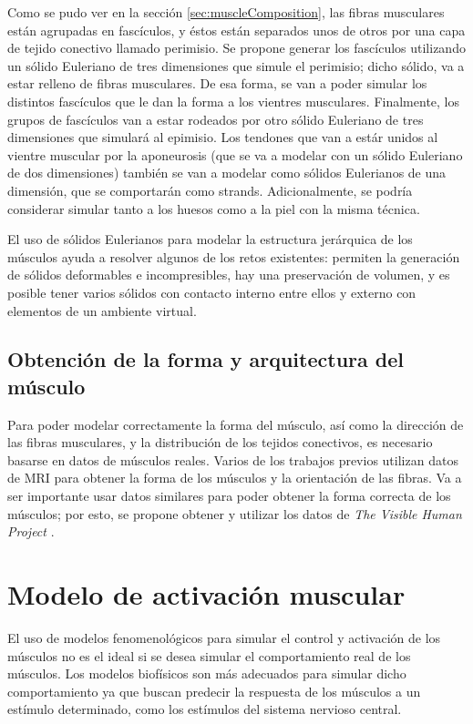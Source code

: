 Como se pudo ver en la sección \ref{sec:muscleComposition}, las fibras musculares están agrupadas en fascículos, y  éstos están separados unos de otros por una capa de tejido conectivo llamado perimisio. Se propone generar los fascículos utilizando un sólido Euleriano de tres dimensiones que simule el perimisio; dicho sólido, va a estar relleno de fibras musculares. De esa forma, se van a poder simular los distintos fascículos que le dan la forma a los vientres musculares. Finalmente, los grupos de fascículos van a estar rodeados por otro sólido Euleriano de tres dimensiones que simulará al epimisio. Los tendones que van a estár unidos al vientre muscular por la aponeurosis (que se va a modelar con un sólido Euleriano de dos dimensiones) también se van a modelar como sólidos Eulerianos de una dimensión, que se comportarán como strands. Adicionalmente, se podría considerar simular tanto a los huesos como a la piel con la misma técnica.

El uso de sólidos Eulerianos para modelar la estructura jerárquica de los músculos ayuda a resolver algunos de los retos existentes: permiten la generación de sólidos deformables e incompresibles, hay una preservación de volumen, y es posible tener varios sólidos con contacto interno entre ellos y externo con elementos de un ambiente virtual.

\subsection{Obtención de la forma y arquitectura del músculo} 

Para poder modelar correctamente la forma del músculo, así como la dirección de las fibras musculares, y la distribución de los tejidos conectivos, es necesario basarse en datos de músculos reales. Varios de los trabajos previos utilizan datos de MRI para obtener la forma de los músculos y la orientación de las fibras. Va a ser importante usar datos similares para poder obtener la forma correcta de los músculos; por esto, se propone obtener y utilizar los datos de \textit{The Visible Human Project} \citep{visibleHumanProject}.

\section{Modelo de activación muscular}

El uso de modelos fenomenológicos para simular el control y activación de los músculos no es el ideal si se desea simular el comportamiento real de los músculos. Los modelos biofísicos son más adecuados para simular dicho comportamiento ya que buscan predecir la respuesta de los músculos a un estímulo determinado, como los estímulos del sistema nervioso central. 

